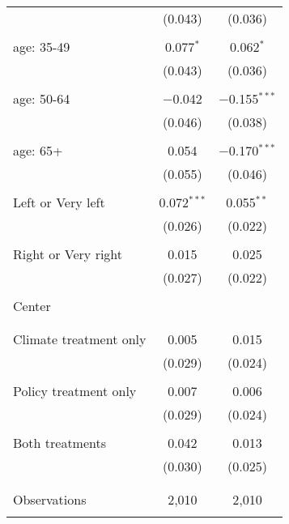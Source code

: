 \begin{tabular}{@{\extracolsep{5pt}}lcc}
  & (0.043) & (0.036) \\ 
  & & \\ 
 age: 35-49 & 0.077$^{*}$ & 0.062$^{*}$ \\ 
  & (0.043) & (0.036) \\ 
  & & \\ 
 age: 50-64 & $-$0.042 & $-$0.155$^{***}$ \\ 
  & (0.046) & (0.038) \\ 
  & & \\ 
 age: 65+ & 0.054 & $-$0.170$^{***}$ \\ 
  & (0.055) & (0.046) \\ 
  & & \\ 
 Left or Very left & 0.072$^{***}$ & 0.055$^{**}$ \\ 
  & (0.026) & (0.022) \\ 
  & & \\ 
 Right or Very right & 0.015 & 0.025 \\ 
  & (0.027) & (0.022) \\ 
  & & \\ 
 Center &  &  \\ 
  &  &  \\ 
  & & \\ 
 Climate treatment only & 0.005 & 0.015 \\ 
  & (0.029) & (0.024) \\ 
  & & \\ 
 Policy treatment only & 0.007 & 0.006 \\ 
  & (0.029) & (0.024) \\ 
  & & \\ 
 Both treatments & 0.042 & 0.013 \\ 
  & (0.030) & (0.025) \\ 
  & & \\ 
\hline \\[-1.8ex] 

Observations & 2,010 & 2,010 \\ 
\hline 
\hline \\[-1.8ex] 
\end{tabular} 